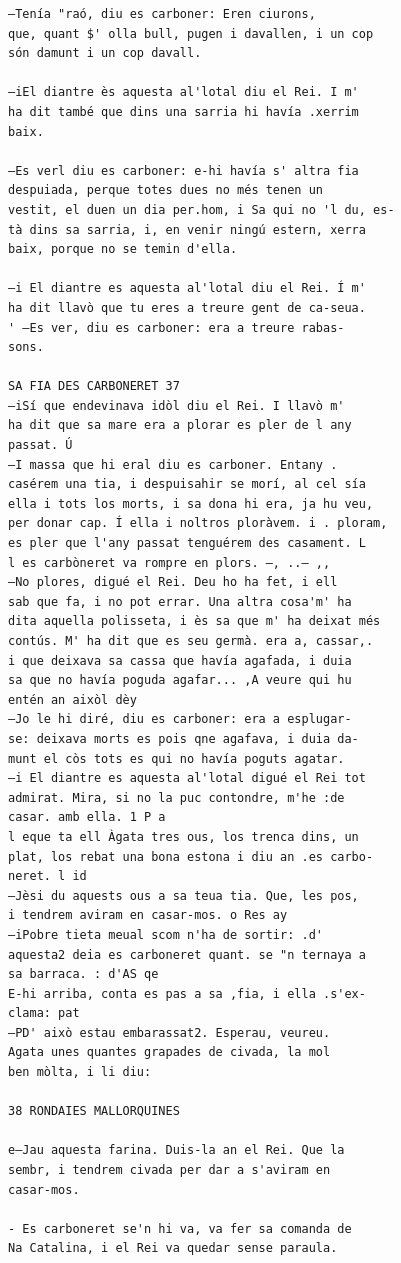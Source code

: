 \documentclass[
  letterpaper,
  DIV=11,
  numbers=noendperiod]{scrreprt}
\begin{document}
\begin{verbatim}
—Tenía "raó, diu es carboner: Eren ciurons,
que, quant $' olla bull, pugen i davallen, i un cop
són damunt i un cop davall.

—iEl diantre ès aquesta al'lotal diu el Rei. I m'
ha dit també que dins una sarria hi havía .xerrim
baix.

—Es verl diu es carboner: e-hi havía s' altra fia
despuiada, perque totes dues no més tenen un
vestit, el duen un dia per.hom, i Sa qui no 'l du, es-
tà dins sa sarria, i, en venir ningú estern, xerra
baix, porque no se temin d'ella.

—i El diantre es aquesta al'lotal diu el Rei. Í m'
ha dit llavò que tu eres a treure gent de ca-seua.
' —Es ver, diu es carboner: era a treure rabas-
sons.

SA FIA DES CARBONERET 37
—iSí que endevinava idòl diu el Rei. I llavò m'
ha dit que sa mare era a plorar es pler de l any
passat. Ú
—I massa que hi eral diu es carboner. Entany .
casérem una tia, i despuisahir se morí, al cel sía
ella i tots los morts, i sa dona hi era, ja hu veu,
per donar cap. Í ella i noltros ploràvem. i . ploram,
es pler que l'any passat tenguérem des casament. L
l es carbòneret va rompre en plors. —, ..— ,,
—No plores, digué el Rei. Deu ho ha fet, i ell
sab que fa, i no pot errar. Una altra cosa'm' ha
dita aquella polisseta, i ès sa que m' ha deixat més
contús. M' ha dit que es seu germà. era a, cassar,.
i que deixava sa cassa que havía agafada, i duia
sa que no havía poguda agafar... ,A veure qui hu
entén an aixòl dèy
—Jo le hi diré, diu es carboner: era a esplugar-
se: deixava morts es pois qne agafava, i duia da-
munt el còs tots es qui no havía poguts agatar.
—i El diantre es aquesta al'lotal digué el Rei tot
admirat. Mira, si no la puc contondre, m'he :de
casar. amb ella. 1 P a
l eque ta ell Àgata tres ous, los trenca dins, un
plat, los rebat una bona estona i diu an .es carbo-
neret. l id
—Jèsi du aquests ous a sa teua tia. Que, les pos,
i tendrem aviram en casar-mos. o Res ay
—iPobre tieta meual scom n'ha de sortir: .d'
aquesta2 deia es carboneret quant. se "n ternaya a
sa barraca. : d'AS qe
E-hi arriba, conta es pas a sa ,fia, i ella .s'ex-
clama: pat
—PD' això estau embarassat2. Esperau, veureu.
Agata unes quantes grapades de civada, la mol
ben mòlta, i li diu:

38 RONDAIES MALLORQUINES

e—Jau aquesta farina. Duis-la an el Rei. Que la
sembr, i tendrem civada per dar a s'aviram en
casar-mos.

- Es carboneret se'n hi va, va fer sa comanda de
Na Catalina, i el Rei va quedar sense paraula.


\end{verbatim}
\end{document}
